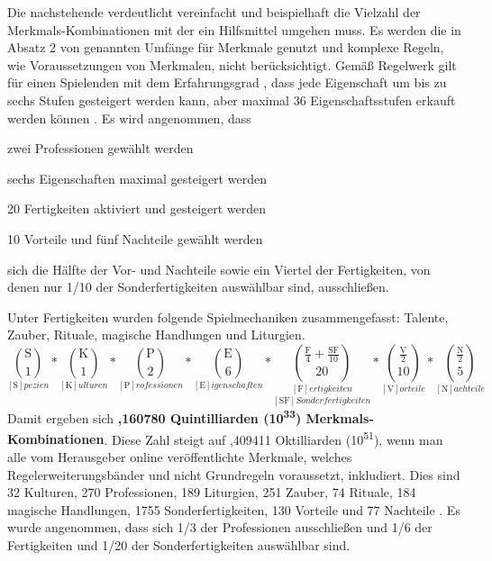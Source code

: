 Die nachstehende  verdeutlicht vereinfacht und beispielhaft die Vielzahl der Merkmals-Kombinationen mit der ein Hilfsmittel umgehen muss.
Es werden die in Absatz 2 von  genannten Umfänge für Merkmale genutzt und komplexe Regeln, wie \zB Voraussetzungen von Merkmalen, nicht berücksichtigt.
Gemäß Regelwerk gilt für einen Spielenden mit dem Erfahrungsgrad , dass jede Eigenschaft um bis zu sechs Stufen gesteigert werden kann, aber maximal 36 Eigenschaftsstufen erkauft werden können .
Es wird angenommen, dass
\begin{itemize*}[label={}, itemjoin={,}, itemjoin*={{ und}}]
    \item zwei Professionen gewählt werden
    \item sechs Eigenschaften maximal gesteigert werden
    \item 20 Fertigkeiten aktiviert und gesteigert werden
    \item 10 Vorteile und fünf Nachteile gewählt werden
    \item sich die Hälfte der Vor- und Nachteile sowie ein Viertel der Fertigkeiten, von denen nur 1/10 der Sonderfertigkeiten auswählbar sind, ausschließen.
\end{itemize*}
Unter Fertigkeiten wurden folgende Spielmechaniken zusammengefasst: Talente, Zauber, Rituale, magische Handlungen und Liturgien.
\begin{equation}
    \label{eq:merkmals-kombinationen}
    \underset{[\textrm{S}]pezien}{
        \binom{\textrm{S}}{1}
    } *
    \underset{[\textrm{K}]ulturen}{
        \binom{\textrm{K}}{1}
    } *
    \underset{[\textrm{P}]rofessionen}{
        \binom{\textrm{P}}{2}
    } *
    \underset{[\textrm{E}]igenschaften}{
        \binom{\textrm{E}}{6}
    } *
    \underset{[\textrm{SF}] Sonderfertigkeiten}{
        \underset{[\textrm{F}]ertigkeiten}{
            \binom{\frac{\textrm{F}}{4}+\frac{\textrm{SF}}{10}}{20}
        }
    } *
    \underset{[\textrm{V}]orteile}{
        \binom{\frac{\textrm{V}}{2}}{10}
    } *
    \underset{[\textrm{N}]achteile}{
        \binom{\frac{\textrm{N}}{2}}{5}
    }
\end{equation}
Damit ergeben sich \textbf{,160780 Quintilliarden (10\textsuperscript{33}) Merkmals-Kombinationen}.
Diese Zahl steigt auf ,409411 Oktilliarden (10\textsuperscript{51}), wenn man alle vom Herausgeber online veröffentlichte Merkmale, welches Regelerweiterungsbänder und nicht Grundregeln voraussetzt, inkludiert.
Dies sind 32 Kulturen, 270 Professionen, 189 Liturgien, 251 Zauber, 74 Rituale, 184 magische Handlungen, 1755 Sonderfertigkeiten, 130 Vorteile und 77 Nachteile .
Es wurde angenommen, dass sich 1/3 der Professionen ausschließen und 1/6 der Fertigkeiten und 1/20 der Sonderfertigkeiten auswählbar sind.